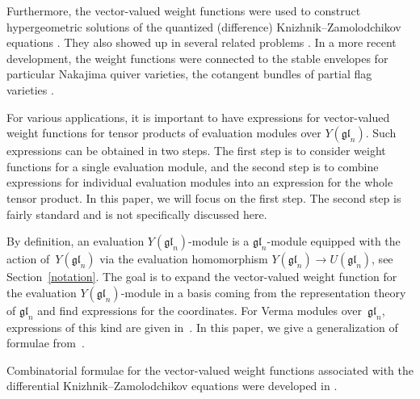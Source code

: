 \documentclass[pdftex]{sigma}
\numberwithin{equation}{section}
\begin{document}
Furthermore, the vector-valued weight functions were used to construct hypergeometric solutions
of the quantized (difference) Knizhnik--Zamolodchikov equations \cite{MTT, TV}. They also showed
up in several related problems \cite{KPT, MTV2, TV3, TV4}. In a more recent development,
the weight functions were connected to the stable envelopes for particular Nakajima quiver
varieties, the cotangent bundles of partial flag varieties \cite{RTV1, RTV2, RTV3, RTV4, TV5}.

For various applications, it is important to have expressions for vector-valued weight functions
for tensor products of evaluation modules over $Y(\mathfrak{gl}_n)$. Such expressions can be
obtained in two steps. The first step is to consider weight functions for a single evaluation
module, and the second step is to combine expressions for individual evaluation modules
into an expression for the whole tensor product. In this paper, we will focus on the first step.
The second step is fairly standard and is not specifically discussed here.

By definition, an evaluation $Y(\mathfrak{gl}_n)$-module is a $\mathfrak{gl}_n$-module
equipped with the action of~$Y(\mathfrak{gl}_n)$ via the evaluation homomorphism
$Y(\mathfrak{gl}_n)\rightarrow U(\mathfrak{gl}_n)$, see Section~\ref{notation}. The goal is
to expand the vector-valued weight function for the evaluation $Y(\mathfrak{gl}_n)$-module
in a basis coming from the representation theory of $\mathfrak{gl}_n$ and find expressions
for the coordinates. For Verma modules over~$\mathfrak{gl}_n$, expressions of this kind are given
in~\cite{TVC}. In this paper, we give a generalization of formulae from~\cite{TVC}.

Combinatorial formulae for the vector-valued weight functions associated with the differential
Knizhnik--Zamolodchikov equations were developed in \cite{FRV,MV, M,RSV,SV1,SV2}.
\end{document}
